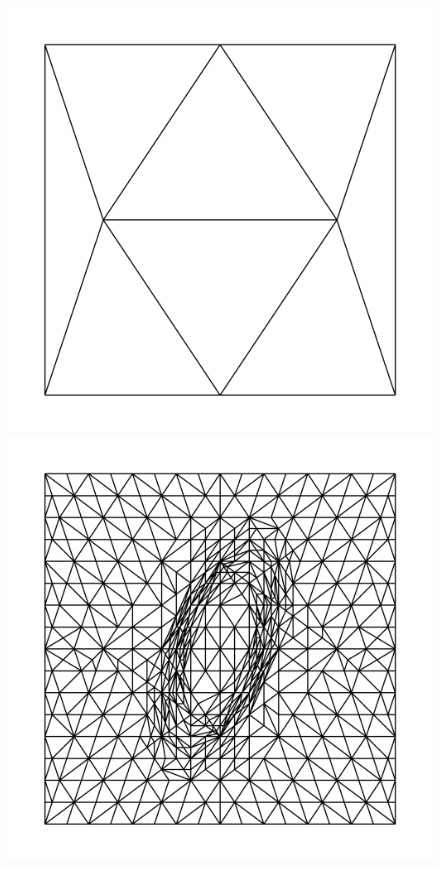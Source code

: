    \begin{figure}
        \centering
        \includegraphics[width=0.94\columnwidth]{../images/bell_before_refinement.png}
        \label{fig:bell_before}
        \includegraphics[width=0.94\columnwidth]{../images/bell_after_refinement.png}

\end{figure}
